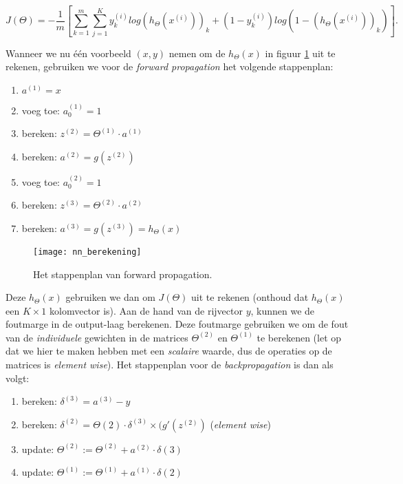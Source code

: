 \[
J(\Theta) = -\frac{1}{m}\left[\sum_{k=1}^m\sum_{j=1}^K 
  y_k^{(i)}log(h_\Theta(x^{(i)}))_k +
  (1-y_k^{(i)})log(1-(h_\Theta(x^{(i)}))_k) \right].
\]

Wanneer we nu één voorbeeld $(x,y)$ nemen om de $h_\Theta(x)$ in figuur \ref{img:nn_berekening} uit te rekenen, gebruiken we voor de \textit{forward propagation} het volgende stappenplan:

\begin{enumerate}
\item $a^{(1)} = x$
\item voeg toe: $a_0^{(1)} = 1$
\item bereken: $z^{(2)} = \Theta^{(1)}\cdot a^{(1)}$
\item bereken: $a^{(2)} = g(z^{(2)})$
\item voeg toe: $a_0^{(2)}=1$
\item bereken: $z^{(3)} = \Theta^{(2)}\cdot a^{(2)}$
\item bereken: $a^{(3)} = g(z^{(3)}) = h_\Theta(x)$
\end{enumerate}

\begin{figure}[h]
\centering
\texttt{[image: nn\_berekening]}
\caption{Het stappenplan van forward propagation.\label{img:nn_berekening}}
\end{figure}

Deze $h_\Theta(x)$ gebruiken we dan om $J(\Theta)$ uit te rekenen (onthoud dat $h_\Theta(x)$ een $K \times 1$ kolomvector is). Aan de hand van de rijvector $y$, kunnen we de foutmarge in de output-laag berekenen. Deze foutmarge gebruiken we om de fout van de \textit{individuele} gewichten in de matrices $\Theta^{(2)}$ en $\Theta^{(1)}$ te berekenen (let op dat we hier te maken hebben met een \textit{scalaire} waarde, dus de operaties op de matrices is \textit{element wise}). Het stappenplan voor de \textit{backpropagation} is dan als volgt:

\begin{enumerate}
\item bereken: $\delta^{(3)} = a^{(3)} - y$
\item bereken: $\delta^{(2)} = \Theta{(2)} \cdot \delta^{(3)} \times (g'(z^{(2)})$ (\textit{element wise})
\item update: $\Theta^{(2)} := \Theta^{(2)} + a^{(2)} \cdot \delta{(3)}$
\item update: $\Theta^{(1)} := \Theta^{(1)} + a^{(1)} \cdot \delta{(2)}$
\end{enumerate}


